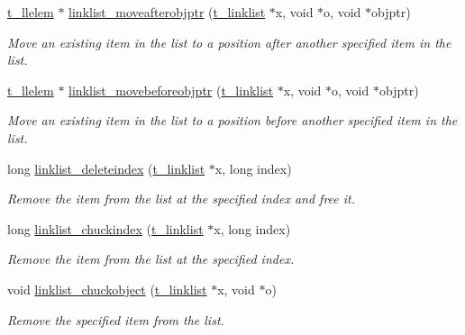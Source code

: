 \begin{DoxyCompactItemize}
\hyperlink{structt__llelem}{t\_\-llelem} $\ast$ \hyperlink{group__linklist_ga429e12adff823ce46dc54649a271cefd}{linklist\_\-moveafterobjptr} (\hyperlink{structt__linklist}{t\_\-linklist} $\ast$x, void $\ast$o, void $\ast$objptr)
\begin{DoxyCompactList}\small\item\em Move an existing item in the list to a position after another specified item in the list. \item\end{DoxyCompactList}\item 
\hyperlink{structt__llelem}{t\_\-llelem} $\ast$ \hyperlink{group__linklist_ga3a91552cbd18988575d9ae31ff863812}{linklist\_\-movebeforeobjptr} (\hyperlink{structt__linklist}{t\_\-linklist} $\ast$x, void $\ast$o, void $\ast$objptr)
\begin{DoxyCompactList}\small\item\em Move an existing item in the list to a position before another specified item in the list. \item\end{DoxyCompactList}\item 
long \hyperlink{group__linklist_ga8a93071a90ca14ed02a32fa09f9e13f9}{linklist\_\-deleteindex} (\hyperlink{structt__linklist}{t\_\-linklist} $\ast$x, long index)
\begin{DoxyCompactList}\small\item\em Remove the item from the list at the specified index and free it. \item\end{DoxyCompactList}\item 
long \hyperlink{group__linklist_gaa89cf5b917b41ad0c15963dd79800b50}{linklist\_\-chuckindex} (\hyperlink{structt__linklist}{t\_\-linklist} $\ast$x, long index)
\begin{DoxyCompactList}\small\item\em Remove the item from the list at the specified index. \item\end{DoxyCompactList}\item 
void \hyperlink{group__linklist_ga6621c47c664c57d794ea2540b62d0956}{linklist\_\-chuckobject} (\hyperlink{structt__linklist}{t\_\-linklist} $\ast$x, void $\ast$o)
\begin{DoxyCompactList}\small\item\em Remove the specified item from the list. \item\end{DoxyCompactList}\item 

\end{DoxyCompactItemize}
